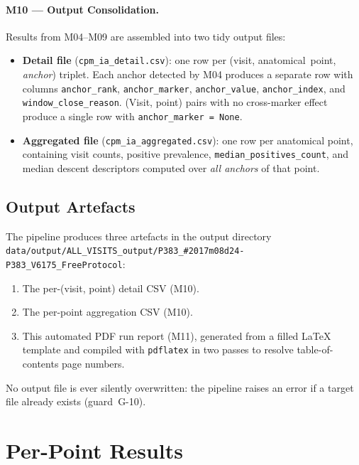 \documentclass[a4paper,11pt]{article}
\begin{document}
\paragraph{M10 --- Output Consolidation.}
Results from M04--M09 are assembled into two tidy output files:
\begin{itemize}
  \item \textbf{Detail file} (\texttt{cpm\_ia\_detail.csv}): one row per
        (visit, anatomical~point, \emph{anchor}) triplet. Each anchor detected by M04
        produces a separate row with columns \texttt{anchor\_rank},
        \texttt{anchor\_marker}, \texttt{anchor\_value}, \texttt{anchor\_index},
        and \texttt{window\_close\_reason}.
        (Visit, point) pairs with no cross-marker effect produce a single row with
        \texttt{anchor\_marker = None}.
  \item \textbf{Aggregated file} (\texttt{cpm\_ia\_aggregated.csv}): one row per
        anatomical point, containing visit counts, positive prevalence,
        \texttt{median\_positives\_count}, and median descent descriptors computed over
        \emph{all anchors} of that point.
\end{itemize}

\subsection{Output Artefacts}

The pipeline produces three artefacts in the output directory \texttt{data/output/ALL\_VISITS\_output/P383\_\#2017m08d24-P383\_V6175\_FreeProtocol}:
\begin{enumerate}
  \item The per-(visit, point) detail CSV (M10).
  \item The per-point aggregation CSV (M10).
  \item This automated PDF run report (M11), generated from a filled \LaTeX{} template
        and compiled with \texttt{pdflatex} in two passes to resolve table-of-contents
        page numbers.
\end{enumerate}
No output file is ever silently overwritten: the pipeline raises an error if a target
file already exists (guard~G-10).

\section{Per-Point Results}
\end{document}
